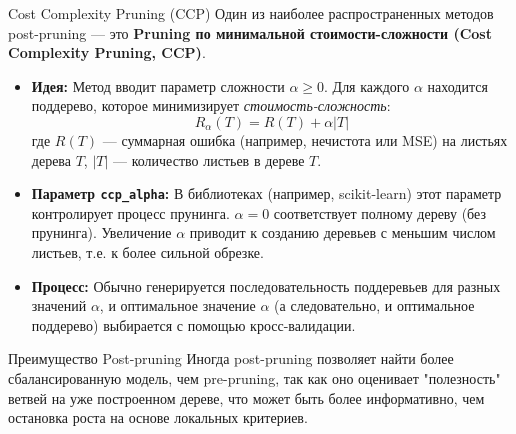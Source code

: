 \begin{myexampleblock}{Cost Complexity Pruning (CCP)}
    Один из наиболее распространенных методов post-pruning — это \textbf{Pruning по минимальной стоимости-сложности (Cost Complexity Pruning, CCP)}.
    \begin{itemize}[nosep, leftmargin=*]
        \item \textbf{Идея:} Метод вводит параметр сложности $\alpha \ge 0$. Для каждого $\alpha$ находится поддерево, которое минимизирует \textit{стоимость-сложность}:
          \[ R_\alpha(T) = R(T) + \alpha |T| \]
          где $R(T)$ — суммарная ошибка (например, нечистота или MSE) на листьях дерева $T$, $|T|$ — количество листьев в дереве $T$.
        \item \textbf{Параметр \texttt{ccp\_alpha}:} В библиотеках (например, scikit-learn) этот параметр контролирует процесс прунинга. $\alpha=0$ соответствует полному дереву (без прунинга). Увеличение $\alpha$ приводит к созданию деревьев с меньшим числом листьев, т.е. к более сильной обрезке.
        \item \textbf{Процесс:} Обычно генерируется последовательность поддеревьев для разных значений $\alpha$, и оптимальное значение $\alpha$ (а следовательно, и оптимальное поддерево) выбирается с помощью кросс-валидации.
    \end{itemize}
\end{myexampleblock}

\begin{textbox}{Преимущество Post-pruning}
    Иногда post-pruning позволяет найти более сбалансированную модель, чем pre-pruning, так как оно оценивает "полезность" ветвей на уже построенном дереве, что может быть более информативно, чем остановка роста на основе локальных критериев.
\end{textbox}

